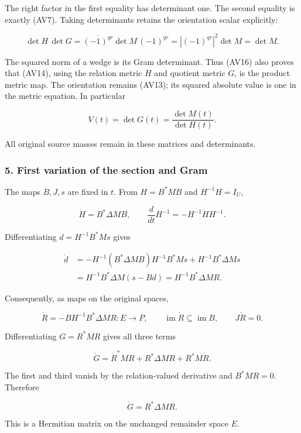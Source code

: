 \documentclass{article}
\begin{document}
The right factor in the first equality has determinant one. The second equality is exactly (AV7). Taking determinants retains the orientation scalar explicitly:

\[
\det H\,\det G
=\overline{(-1)^{qr}}\det M\,(-1)^{qr}
=|(-1)^{qr}|^2\det M=\det M.
\tag{AV16}
\]

The squared norm of a wedge is its Gram determinant. Thus (AV16) also proves that (AV14), using the relation metric \(H\) and quotient metric \(G\), is the product metric map. The orientation remains (AV13); its squared absolute value is one in the metric equation. In particular

\[
V(t)=\det G(t)=\frac{\det M(t)}{\det H(t)}.
\tag{AV17}
\]

All original source masses remain in these matrices and determinants.

\subsubsection{5. First variation of the section and Gram}\label{endpoint-variation_review--first-variation-of-the-section-and-gram}

The maps \(B,J,s\) are fixed in \(t\). From \(H=B^*MB\) and \(H^{-1}H=I_U\),

\[
\dot H=B^*\Delta M B,\qquad
\frac{d}{dt}H^{-1}=-H^{-1}\dot H H^{-1}.
\tag{AV18}
\]

Differentiating \(d=H^{-1}B^*Ms\) gives

\[
\begin{aligned}
\dot d
&=-H^{-1}(B^*\Delta M B)H^{-1}B^*Ms+H^{-1}B^*\Delta M s\\
&=H^{-1}B^*\Delta M(s-Bd)
=H^{-1}B^*\Delta M R.
\end{aligned}
\tag{AV19}
\]

Consequently, as maps on the original spaces,

\[
\dot R=-BH^{-1}B^*\Delta M R:E\longrightarrow P,\qquad
\operatorname{im}\dot R\subseteq\operatorname{im}B,\qquad J\dot R=0.
\tag{AV20}
\]

Differentiating \(G=R^*MR\) gives all three terms

\[
\dot G=\dot R^*MR+R^*\Delta M R+R^*M\dot R.
\tag{AV21}
\]

The first and third vanish by the relation-valued derivative and \(B^*MR=0\). Therefore

\[
\dot G=R^*\Delta M R.
\tag{AV22}
\]

This is a Hermitian matrix on the unchanged remainder space \(E\).
\end{document}
